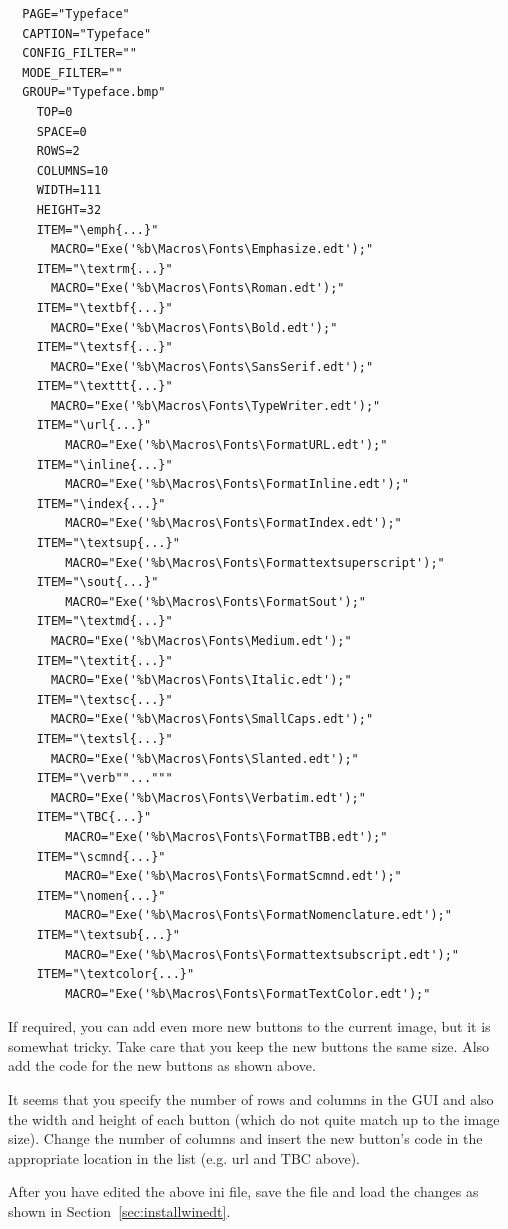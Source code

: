 \begin{lstlisting}
  PAGE="Typeface"
  CAPTION="Typeface"
  CONFIG_FILTER=""
  MODE_FILTER=""
  GROUP="Typeface.bmp"
    TOP=0
    SPACE=0
    ROWS=2
    COLUMNS=10
    WIDTH=111
    HEIGHT=32
    ITEM="\emph{...}"
      MACRO="Exe('%b\Macros\Fonts\Emphasize.edt');"
    ITEM="\textrm{...}"
      MACRO="Exe('%b\Macros\Fonts\Roman.edt');"
    ITEM="\textbf{...}"
      MACRO="Exe('%b\Macros\Fonts\Bold.edt');"
    ITEM="\textsf{...}"
      MACRO="Exe('%b\Macros\Fonts\SansSerif.edt');"
    ITEM="\texttt{...}"
      MACRO="Exe('%b\Macros\Fonts\TypeWriter.edt');"
    ITEM="\url{...}"
        MACRO="Exe('%b\Macros\Fonts\FormatURL.edt');"
    ITEM="\inline{...}"
        MACRO="Exe('%b\Macros\Fonts\FormatInline.edt');"
    ITEM="\index{...}"
        MACRO="Exe('%b\Macros\Fonts\FormatIndex.edt');"
    ITEM="\textsup{...}"
        MACRO="Exe('%b\Macros\Fonts\Formattextsuperscript');"
    ITEM="\sout{...}"
        MACRO="Exe('%b\Macros\Fonts\FormatSout');"
    ITEM="\textmd{...}"
      MACRO="Exe('%b\Macros\Fonts\Medium.edt');"
    ITEM="\textit{...}"
      MACRO="Exe('%b\Macros\Fonts\Italic.edt');"
    ITEM="\textsc{...}"
      MACRO="Exe('%b\Macros\Fonts\SmallCaps.edt');"
    ITEM="\textsl{...}"
      MACRO="Exe('%b\Macros\Fonts\Slanted.edt');"
    ITEM="\verb""..."""
      MACRO="Exe('%b\Macros\Fonts\Verbatim.edt');"
    ITEM="\TBC{...}"
        MACRO="Exe('%b\Macros\Fonts\FormatTBB.edt');"
    ITEM="\scmnd{...}"
        MACRO="Exe('%b\Macros\Fonts\FormatScmnd.edt');"
    ITEM="\nomen{...}"
        MACRO="Exe('%b\Macros\Fonts\FormatNomenclature.edt');"
    ITEM="\textsub{...}"
        MACRO="Exe('%b\Macros\Fonts\Formattextsubscript.edt');"
    ITEM="\textcolor{...}"
        MACRO="Exe('%b\Macros\Fonts\FormatTextColor.edt');"
\end{lstlisting}

If required, you can add even more new buttons to the current image, but it is somewhat tricky. Take care that you keep the new buttons the same size. Also add the code for the new buttons as shown above.

It seems that you specify the number of rows and columns in the GUI and also the width and height of each button (which do not quite match up to the image size).  Change the number of columns and insert the new button's code in the appropriate location in the list (e.g. url and TBC above).

After you have edited the above ini file, save the file and load the changes as shown in Section~\ref{sec:installwinedt}.

